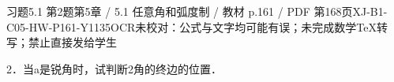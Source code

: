 \begin{bankitem}{习题5.1 第2题}{第5章 / 5.1 任意角和弧度制 / 教材 p.161 / PDF 第168页}{XJ-B1-C05-HW-P161-Y1135}{OCR未校对：公式与文字均可能有误；未完成数学TeX转写；禁止直接发给学生}
\begin{ocrdraft}
\par
2．当a是锐角时，试判断2角的终边的位置．
\end{ocrdraft}
\end{bankitem}
